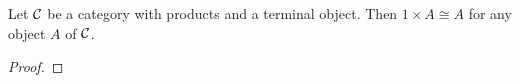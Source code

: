 \begin{proposition}
  Let \(\mathcal C\) be a category with products and a terminal object.
  Then \(1 \times A \cong A\) for any object \(A\) of \(\mathcal C\).
\end{proposition}
\begin{proof}



\end{proof}
